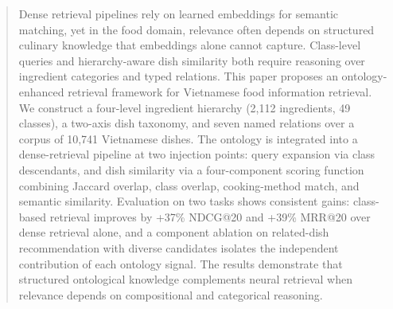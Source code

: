\begin{abstract}
Dense retrieval pipelines rely on learned embeddings for semantic matching, yet in the food domain, relevance often depends on structured culinary knowledge that embeddings alone cannot capture. Class-level queries and hierarchy-aware dish similarity both require reasoning over ingredient categories and typed relations. This paper proposes an ontology-enhanced retrieval framework for Vietnamese food information retrieval. We construct a four-level ingredient hierarchy (2{,}112 ingredients, 49 classes), a two-axis dish taxonomy, and seven named relations over a corpus of 10{,}741 Vietnamese dishes. The ontology is integrated into a dense-retrieval pipeline at two injection points: query expansion via class descendants, and dish similarity via a four-component scoring function combining Jaccard overlap, class overlap, cooking-method match, and semantic similarity. Evaluation on two tasks shows consistent gains: class-based retrieval improves by +37\% NDCG@20 and +39\% MRR@20 over dense retrieval alone, and a component ablation on related-dish recommendation with diverse candidates isolates the independent contribution of each ontology signal. The results demonstrate that structured ontological knowledge complements neural retrieval when relevance depends on compositional and categorical reasoning.
\end{abstract}
